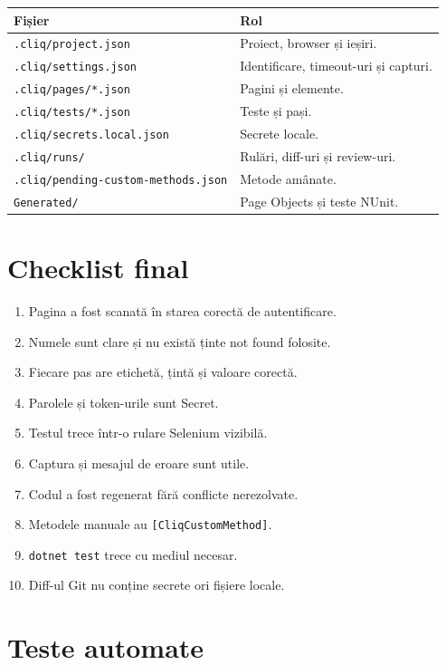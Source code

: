 \documentclass[12pt,a4paper]{report}
\newcommand{\File}[1]{\nolinkurl{#1}}
\begin{document}
\begin{tabularx}{\textwidth}{@{}p{5.2cm}Y@{}}
\toprule \textbf{Fișier} & \textbf{Rol} \\
\midrule
\File{.cliq/project.json} & Proiect, browser și ieșiri. \\
\File{.cliq/settings.json} & Identificare, timeout-uri și capturi. \\
\File{.cliq/pages/*.json} & Pagini și elemente. \\
\File{.cliq/tests/*.json} & Teste și pași. \\
\File{.cliq/secrets.local.json} & Secrete locale. \\
\File{.cliq/runs/} & Rulări, diff-uri și review-uri. \\
\File{.cliq/pending-custom-methods.json} & Metode amânate. \\
\File{Generated/} & Page Objects și teste NUnit. \\
\bottomrule
\end{tabularx}

\chapter{Checklist final}

\begin{enumerate}
  \item Pagina a fost scanată în starea corectă de autentificare.
  \item Numele sunt clare și nu există ținte not found folosite.
  \item Fiecare pas are etichetă, țintă și valoare corectă.
  \item Parolele și token-urile sunt Secret.
  \item Testul trece într-o rulare Selenium vizibilă.
  \item Captura și mesajul de eroare sunt utile.
  \item Codul a fost regenerat fără conflicte nerezolvate.
  \item Metodele manuale au \File{[CliqCustomMethod]}.
  \item \File{dotnet test} trece cu mediul necesar.
  \item Diff-ul Git nu conține secrete ori fișiere locale.
\end{enumerate}

\chapter{Teste automate}
\end{document}
